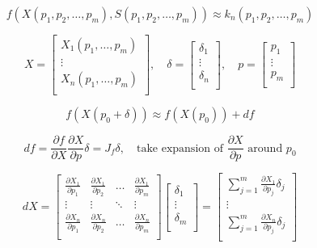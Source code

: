 \documentclass{article}
\begin{document}
\begin{multicols}{2}
	\[
		f(X(p_1, p_2, \ldots, p_m), S(p_1, p_2, \ldots, p_m)) \approx k_n (p_1, p_2, \ldots, p_m)
	\]

	\[
		X = \begin{bmatrix}
			X_1(p_1, \ldots, p_m) \\
			\vdots                \\
			X_n(p_1, \ldots, p_m) \\
		\end{bmatrix},
		\quad
		\delta = \begin{bmatrix}
			\delta_1 \\
			\vdots   \\
			\delta_n \\
		\end{bmatrix},
		\quad
		p = \begin{bmatrix}
			p_1    \\
			\vdots \\
			p_m    \\
		\end{bmatrix}
	\]

	\[
		f(X(p_0 + \delta)) \approx f(X(p_0)) + df
	\]

	\[
		df = \frac{\partial f}{\partial X} \frac{\partial X}{\partial p} \delta = J_f \delta,
		\quad
		\text{take expansion of } \frac{\partial X}{\partial p} \text{ around } p_0
	\]

	\[
		dX = \begin{bmatrix}
			\frac{\partial X_1}{\partial p_1} & \frac{\partial X_1}{\partial p_2} & \ldots & \frac{\partial X_1}{\partial p_m} \\
			\vdots                            & \vdots                            & \ddots & \vdots                            \\
			\frac{\partial X_n}{\partial p_1} & \frac{\partial X_n}{\partial p_2} & \ldots & \frac{\partial X_n}{\partial p_m} \\
		\end{bmatrix}
		\begin{bmatrix}
			\delta_1 \\
			\vdots   \\
			\delta_m \\
		\end{bmatrix}
		= \begin{bmatrix}
			\sum \limits_{j=1}^{m} \frac{\partial X_1}{\partial p_j} \delta_j \\
			\vdots                                                            \\
			\sum \limits_{j=1}^{m} \frac{\partial X_n}{\partial p_j} \delta_j \\
		\end{bmatrix}
	\]



\end{multicols}
\end{document}
